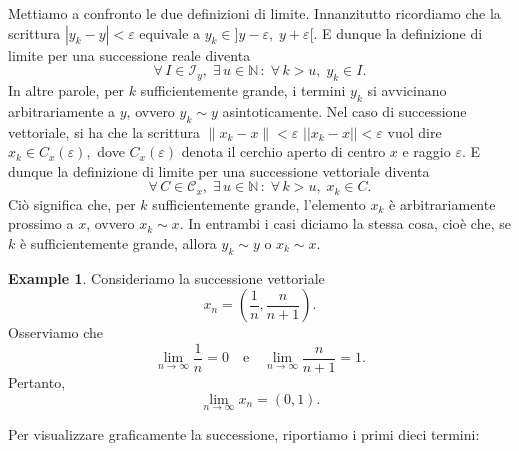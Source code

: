 \documentclass{article}
\theoremstyle{plain}
\theoremstyle{definition}
\newtheorem{exmp}{Example}[section]
\theoremstyle{remark}
\begin{document}
\vspace{10pt}

Mettiamo a confronto le due definizioni di limite. Innanzitutto ricordiamo che la scrittura $|y_k - y| < \varepsilon$ equivale a $y_k \in ] y - \varepsilon,\; y + \varepsilon[$.
E dunque la definizione di limite per una successione reale diventa
\[
\forall\,I\in\mathcal{I}_y,\; \exists\, u\in\mathbb{N}\,:\; \forall\, k>u,\; y_k\in I.
\]
In altre parole, per $k$ sufficientemente grande, i termini $y_k$ si avvicinano arbitrariamente a $y$, ovvero $y_k \sim y$ asintoticamente.
Nel caso di successione vettoriale, si ha che la scrittura $\| x_k - x \| < \varepsilon$  $|| x_k - x || < \varepsilon$ vuol dire $x_k \in C_{x}(\varepsilon),$
dove $C_{x}(\varepsilon)$ denota il cerchio aperto di centro $x$ e raggio $\varepsilon$. E dunque la definizione di limite per una successione vettoriale diventa
\[
\forall\, C\in\mathcal{C}_x,\; \exists\, u\in\mathbb{N}\,:\; \forall\, k>u,\; x_k\in C.
\]
Ciò significa che, per $k$ sufficientemente grande, l'elemento $x_k$ è arbitrariamente prossimo a $x$, ovvero $x_k \sim x$.
In entrambi i casi diciamo la stessa cosa, cioè che, se $k$ è sufficientemente grande, allora $y_k \sim y$ o $x_k \sim x$.

\vspace{10pt}

\begin{exmp}

Consideriamo la successione vettoriale
\[
x_n=\left(\frac{1}{n},\frac{n}{n+1}\right).
\]
Osserviamo che
\[
\lim_{n\to\infty}\frac{1}{n}=0\quad\text{e}\quad\lim_{n\to\infty}\frac{n}{n+1}=1.
\]
Pertanto,
\[
\lim_{n\to\infty} x_n=(0,1).
\]

Per visualizzare graficamente la successione, riportiamo i primi dieci termini:
\begin{center}
    \end{center}
\end{exmp}
\end{document}
